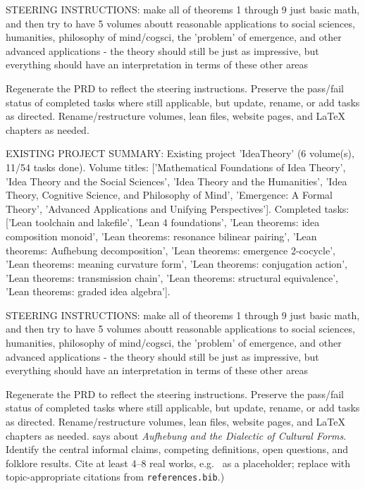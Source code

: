 STEERING INSTRUCTIONS: make all of theorems 1 through 9 just basic math, and then try to have 5 volumes aboutt reasonable applications to social sciences, humanities, philosophy of mind/cogsci, the 'problem' of emergence, and other advanced applications - the theory should still be just as impressive, but everything should have an interpretation in terms of these other areas

Regenerate the PRD to reflect the steering instructions. Preserve the pass/fail status of completed tasks where still applicable, but update, rename, or add tasks as directed. Rename/restructure volumes, lean files, website pages, and LaTeX chapters as needed.

EXISTING PROJECT SUMMARY: Existing project 'IdeaTheory' (6 volume(s), 11/54 tasks done). Volume titles: ['Mathematical Foundations of Idea Theory', 'Idea Theory and the Social Sciences', 'Idea Theory and the Humanities', 'Idea Theory, Cognitive Science, and Philosophy of Mind', 'Emergence: A Formal Theory', 'Advanced Applications and Unifying Perspectives']. Completed tasks: ['Lean toolchain and lakefile', 'Lean 4 foundations', 'Lean theorems: idea composition monoid', 'Lean theorems: resonance bilinear pairing', 'Lean theorems: Aufhebung decomposition', 'Lean theorems: emergence 2-cocycle', 'Lean theorems: meaning curvature form', 'Lean theorems: conjugation action', 'Lean theorems: transmission chain', 'Lean theorems: structural equivalence', 'Lean theorems: graded idea algebra'].

STEERING INSTRUCTIONS: make all of theorems 1 through 9 just basic math, and then try to have 5 volumes aboutt reasonable applications to social sciences, humanities, philosophy of mind/cogsci, the 'problem' of emergence, and other advanced applications - the theory should still be just as impressive, but everything should have an interpretation in terms of these other areas

Regenerate the PRD to reflect the steering instructions. Preserve the pass/fail status of completed tasks where still applicable, but update, rename, or add tasks as directed. Rename/restructure volumes, lean files, website pages, and LaTeX chapters as needed. says about \emph{Aufhebung and the Dialectic of Cultural Forms}.  Identify the
        central informal claims, competing definitions, open questions, and
        folklore results.  Cite at least 4--8 real works, e.g.\ \cite{
        lean4_tpil} as a placeholder; replace with topic-appropriate
        citations from \texttt{references.bib}.)

